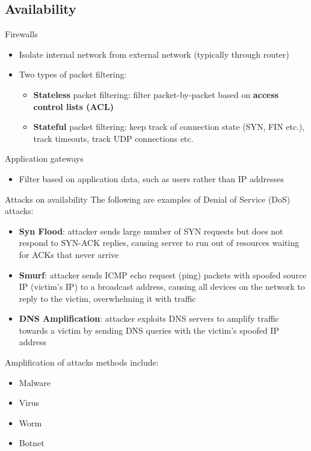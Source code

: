 \subsection{Availability}

\begin{definition}
    {Firewalls}
    \begin{itemize}
        \item Isolate internal network from external network (typically through router)
        \item Two types of packet filtering:
              \begin{itemize}
                  \item \textbf{Stateless} packet filtering: filter packet-by-packet based on \textbf{access control lists (ACL)}
                  \item \textbf{Stateful} packet filtering: keep track of connection state (SYN, FIN etc.), track timeouts, track UDP connections etc.
              \end{itemize}
    \end{itemize}
\end{definition}

\begin{knBox}
    {Application gateways}
    \begin{itemize}
        \item Filter based on application data, such as users rather than IP addresses
    \end{itemize}
\end{knBox}



\begin{theorem}
    {Attacks on availability}
    The following are examples of Denial of Service (DoS) attacks:
    \begin{itemize}
        \item \textbf{Syn Flood}: attacker sends large number of SYN requests but does not respond to SYN-ACK replies, causing server to run out of resources waiting for ACKs that never arrive
        \item \textbf{Smurf}: attacker sends ICMP echo request (ping) packets with spoofed source IP (victim's IP) to a broadcast address, causing all devices on the network to reply to the victim, overwhelming it with traffic
        \item \textbf{DNS Amplification}: attacker exploits DNS servers to amplify traffic towards a victim by sending DNS queries with the victim's spoofed IP address
    \end{itemize}
    Amplification of attacks methods include:
    \begin{itemize}
        \item Malware
        \item Virus
        \item Worm
        \item Botnet
    \end{itemize}
\end{theorem}



